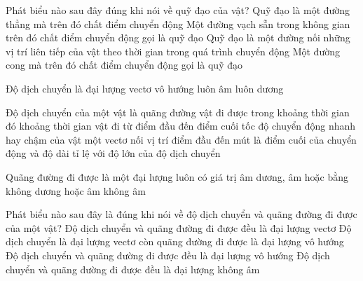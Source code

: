 \begin{ex} Phát biểu nào sau đây đúng khi nói về quỹ đạo của vật?
\choice
{Quỹ đạo là một đường thẳng mà trên đó chất điểm chuyển động}
{Một đường vạch sẵn trong không gian trên đó chất điểm chuyển động gọi là quỹ đạo}
{\True Quỹ đạo là một đường nối những vị trí liên tiếp của vật theo thời gian trong quá trình chuyển động}
{Một đường cong mà trên đó chất điểm chuyển động gọi là quỹ đạo}
\end{ex}

\begin{ex} Độ dịch chuyển là đại lượng
\choice
{\True vectơ}
{vô hướng}
{luôn âm}
{luôn dương}
\end{ex}

\begin{ex} Độ dịch chuyển của một vật là
\choice
{quãng đường vật đi được trong khoảng thời gian đó}
{khoảng thời gian vật đi từ điểm đầu đến điểm cuối}
{tốc độ chuyển động nhanh hay chậm của vật}
{\True một vectơ nối vị trí điểm đầu đến mút là điểm cuối của chuyển động và độ dài tỉ lệ với độ lớn của độ dịch chuyển}
\end{ex}

\begin{ex} Quãng đường đi được là một đại lượng luôn có giá trị
\choice
{âm}
{dương, âm hoặc bằng không}
{dương hoặc âm}
{\True không âm}
\end{ex}

\begin{ex} Phát biểu nào sau đây là đúng khi nói về độ dịch chuyển và quãng đường đi được của một vật?
\choice
{Độ dịch chuyển và quãng đường đi được đều là đại lượng vectơ}
{\True Độ dịch chuyển là đại lượng vectơ còn quãng đường đi được là đại lượng vô hướng}
{Độ dịch chuyển và quãng đường đi được đều là đại lượng vô hướng}
{Độ dịch chuyển và quãng đường đi được đều là đại lượng không âm}
\end{ex}

